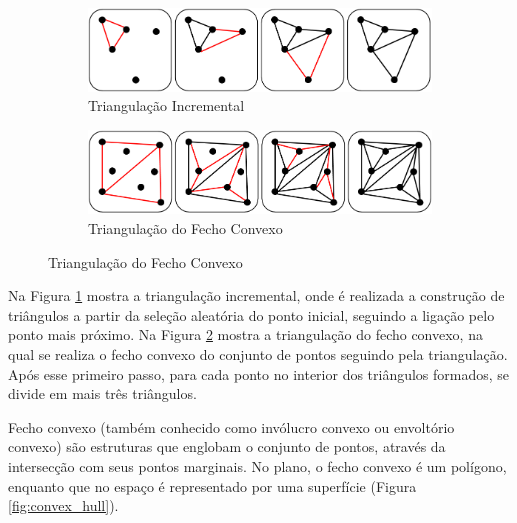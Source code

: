 \begin{figure}[H]
    \centering
    \caption{Exemplos de modelos de triangulação.}
    \begin{subfigure}[t]{0.6\textwidth}
        \includegraphics[width=\textwidth]{dados/figuras/triangulation_incremental.png}
        \caption{Triangulação Incremental}
        \label{fig:incremental_triangulation}
    \end{subfigure}
    \hspace{5em}
    \begin{subfigure}[t]{0.6\textwidth}
        \includegraphics[width=\textwidth]{dados/figuras/triangulation_convex.png}
        \caption{Triangulação do Fecho Convexo}
        \label{fig:convex_triangulation}
    \end{subfigure}
    \label{fig:triangulation}
\end{figure}

Na Figura \ref{fig:incremental_triangulation} mostra a triangulação incremental, onde é realizada a construção de triângulos a partir da seleção aleatória do ponto inicial, seguindo a ligação pelo ponto mais próximo. 
Na Figura \ref{fig:convex_triangulation} mostra a triangulação do fecho convexo, na qual se realiza o fecho convexo do conjunto de pontos seguindo pela triangulação.
Após esse primeiro passo, para cada ponto no interior dos triângulos formados, se divide em mais três triângulos.

Fecho convexo (também conhecido como invólucro convexo ou envoltório convexo) são estruturas que englobam o conjunto de pontos, através da intersecção com seus pontos marginais. No plano, o fecho convexo é um polígono, enquanto que no espaço é representado por uma superfície (Figura \ref{fig:convex_hull}).

